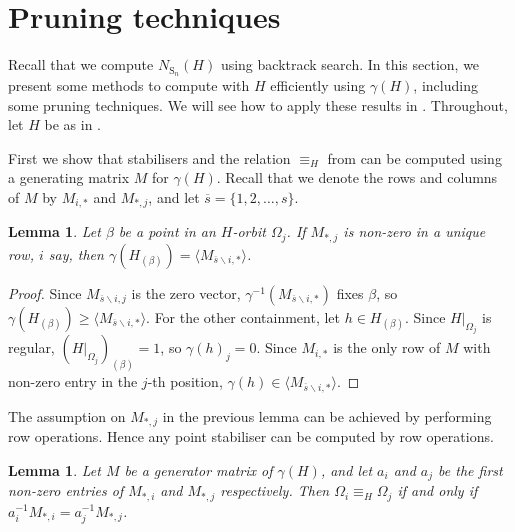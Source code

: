 \documentclass[11pt,a4paper]{article}
\newtheorem{lemma}[theorem]{Lemma}
\theoremstyle{definition}
\theoremstyle{remark}
\newcommand{\Sy}{\mathrm{S}}
\begin{document}

\section{Pruning techniques}
\label{subsection: pruning}


Recall that we compute $N_{\Sy_n}(H)$ using backtrack search. 
In this section, we present some methods to compute with $H$ efficiently using $\gamma(H)$, including some pruning techniques.   
We will see how to apply these results in . 
Throughout, let $H$ be as in . 


First we show that stabilisers and the relation $\equiv_H$ from  can be computed using a generating matrix $M$ for $\gamma(H)$. 
Recall that we denote the rows and columns of $M$ by $M_{i,*}$ and $M_{*,j}$, and let $\overline{s} = \{ 1,2, \ldots, s\}$. 

\begin{lemma} \label{get stab from mat}
Let $\beta$ be a point in an $H$-orbit $\Omega_j$.
If $M_{*,j}$ is non-zero in a unique row, $i$ say, 
then $\gamma(H_{(\beta)}) = \langle M_{\overline{s}\backslash {i},*} \rangle$.
\end{lemma}

\begin{proof}
Since $M_{\overline{s}\backslash {i},j}$ is the zero vector, $\gamma^{-1}( M_{\overline{s}\backslash {i},*})$ fixes $\beta$, so $\gamma(H_{(\beta)}) \geq \langle M_{\overline{s}\backslash {i},*} \rangle$. 
For the other containment, let $h \in H_{(\beta)}$. 
Since $H|_{\Omega_j}$ is regular, $(H|_{\Omega_j})_{(\beta)}=1$, so $\gamma(h)_j = 0$.
Since $M_{i,*}$ is the only row of $M$ with non-zero entry in the $j$-th position, 
$\gamma(h) \in \langle M_{\overline{s} \backslash { i },*} \rangle$.
\end{proof}

The assumption on $M_{*,j}$ in the previous lemma can be achieved by performing row operations. Hence any point stabiliser can be computed by row operations. 

\begin{lemma} \label{id cols are equiv orbits}
Let $M$ be a generator matrix of $\gamma(H)$, and let $a_i$ and $a_j$ be the first non-zero entries of $M_{*,i}$ and $M_{*,j}$ respectively. 
Then $\Omega_i\equiv_H \Omega_j$ if and only if $a_i^{-1} M_{*,i}= a_j^{-1} M_{*,j}$. 
\end{lemma}
\end{document}
